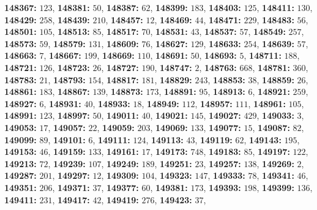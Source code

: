 \textsf{\bfseries 148367:} $123$, \textsf{\bfseries 148381:} $50$, \textsf{\bfseries 148387:} $62$, \textsf{\bfseries 148399:} $183$, \textsf{\bfseries 148403:} $125$, \textsf{\bfseries 148411:} $130$, \textsf{\bfseries 148429:} $258$, \textsf{\bfseries 148439:} $210$, \textsf{\bfseries 148457:} $12$, \textsf{\bfseries 148469:} $44$, \textsf{\bfseries 148471:} $229$, \textsf{\bfseries 148483:} $56$, \textsf{\bfseries 148501:} $105$, \textsf{\bfseries 148513:} $85$, \textsf{\bfseries 148517:} $70$, \textsf{\bfseries 148531:} $43$, \textsf{\bfseries 148537:} $57$, \textsf{\bfseries 148549:} $257$, \textsf{\bfseries 148573:} $59$, \textsf{\bfseries 148579:} $131$, \textsf{\bfseries 148609:} $76$, \textsf{\bfseries 148627:} $129$, \textsf{\bfseries 148633:} $254$, \textsf{\bfseries 148639:} $57$, \textsf{\bfseries 148663:} $7$, \textsf{\bfseries 148667:} $199$, \textsf{\bfseries 148669:} $110$, \textsf{\bfseries 148691:} $50$, \textsf{\bfseries 148693:} $5$, \textsf{\bfseries 148711:} $188$, \textsf{\bfseries 148721:} $126$, \textsf{\bfseries 148723:} $26$, \textsf{\bfseries 148727:} $190$, \textsf{\bfseries 148747:} $2$, \textsf{\bfseries 148763:} $668$, \textsf{\bfseries 148781:} $360$, \textsf{\bfseries 148783:} $21$, \textsf{\bfseries 148793:} $154$, \textsf{\bfseries 148817:} $181$, \textsf{\bfseries 148829:} $243$, \textsf{\bfseries 148853:} $38$, \textsf{\bfseries 148859:} $26$, \textsf{\bfseries 148861:} $183$, \textsf{\bfseries 148867:} $139$, \textsf{\bfseries 148873:} $173$, \textsf{\bfseries 148891:} $95$, \textsf{\bfseries 148913:} $6$, \textsf{\bfseries 148921:} $259$, \textsf{\bfseries 148927:} $6$, \textsf{\bfseries 148931:} $40$, \textsf{\bfseries 148933:} $18$, \textsf{\bfseries 148949:} $112$, \textsf{\bfseries 148957:} $111$, \textsf{\bfseries 148961:} $105$, \textsf{\bfseries 148991:} $123$, \textsf{\bfseries 148997:} $50$, \textsf{\bfseries 149011:} $40$, \textsf{\bfseries 149021:} $145$, \textsf{\bfseries 149027:} $429$, \textsf{\bfseries 149033:} $3$, \textsf{\bfseries 149053:} $17$, \textsf{\bfseries 149057:} $22$, \textsf{\bfseries 149059:} $203$, \textsf{\bfseries 149069:} $133$, \textsf{\bfseries 149077:} $15$, \textsf{\bfseries 149087:} $82$, \textsf{\bfseries 149099:} $89$, \textsf{\bfseries 149101:} $6$, \textsf{\bfseries 149111:} $124$, \textsf{\bfseries 149113:} $43$, \textsf{\bfseries 149119:} $62$, \textsf{\bfseries 149143:} $195$, \textsf{\bfseries 149153:} $46$, \textsf{\bfseries 149159:} $133$, \textsf{\bfseries 149161:} $17$, \textsf{\bfseries 149173:} $748$, \textsf{\bfseries 149183:} $85$, \textsf{\bfseries 149197:} $122$, \textsf{\bfseries 149213:} $72$, \textsf{\bfseries 149239:} $107$, \textsf{\bfseries 149249:} $189$, \textsf{\bfseries 149251:} $23$, \textsf{\bfseries 149257:} $138$, \textsf{\bfseries 149269:} $2$, \textsf{\bfseries 149287:} $201$, \textsf{\bfseries 149297:} $12$, \textsf{\bfseries 149309:} $104$, \textsf{\bfseries 149323:} $147$, \textsf{\bfseries 149333:} $78$, \textsf{\bfseries 149341:} $46$, \textsf{\bfseries 149351:} $206$, \textsf{\bfseries 149371:} $37$, \textsf{\bfseries 149377:} $60$, \textsf{\bfseries 149381:} $173$, \textsf{\bfseries 149393:} $198$, \textsf{\bfseries 149399:} $136$, \textsf{\bfseries 149411:} $231$, \textsf{\bfseries 149417:} $42$, \textsf{\bfseries 149419:} $276$, \textsf{\bfseries 149423:} $37$, 

